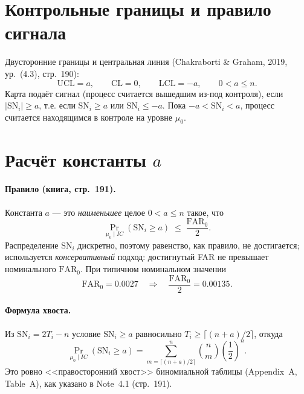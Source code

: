 \documentclass[11pt,a4paper]{article}
\newcommand{\SN}{\mathrm{SN}}
\newcommand{\FAR}{\mathrm{FAR}}
\newcommand{\FARz}{\FAR_0}
\begin{document}
\section{Контрольные границы и правило сигнала}

Двусторонние границы и центральная линия
(Chakraborti \& Graham, 2019, ур.~(4.3), стр.~190):
\begin{equation}
\mathrm{UCL}=a,\qquad \mathrm{CL}=0,\qquad \mathrm{LCL}=-a,
\qquad 0<a\le n .
\label{eq:snlimits}
\end{equation}
Карта подаёт сигнал (процесс считается вышедшим из-под контроля), если
$|\SN_i|\ge a$, т.е. если $\SN_i\ge a$ или $\SN_i\le -a$. Пока
$-a<\SN_i<a$, процесс считается находящимся в контроле на уровне
$\mu_0$.

\section{Расчёт константы $a$}

\paragraph{Правило (книга, стр.~191).}
Константа $a$ --- это \emph{наименьшее} целое $0<a\le n$ такое, что
\begin{equation}
\Pr_{\mu_0\mid IC}(\SN_i\ge a)\;\le\;\frac{\FARz}{2}.
\label{eq:snrule}
\end{equation}
Распределение $\SN_i$ дискретно, поэтому равенство, как правило, не
достигается; используется \emph{консервативный} подход: достигнутый FAR
не превышает номинального $\FARz$. При типичном номинальном значении
\begin{equation}
\FARz = 0.0027 \quad\Longrightarrow\quad \frac{\FARz}{2}=0.00135 .
\label{eq:snfar0}
\end{equation}

\paragraph{Формула хвоста.}
Из $\SN_i=2T_i-n$ условие $\SN_i\ge a$ равносильно
$T_i\ge\lceil (n+a)/2\rceil$, откуда
\begin{equation}
\Pr_{\mu_0\mid IC}(\SN_i\ge a)
=\sum_{m=\lceil (n+a)/2\rceil}^{n}\binom{n}{m}\left(\frac12\right)^{\!n}.
\label{eq:sntail}
\end{equation}
Это ровно <<правосторонний хвост>> биномиальной таблицы (Appendix~A,
Table~A), как указано в Note~4.1 (стр.~191).
\end{document}
